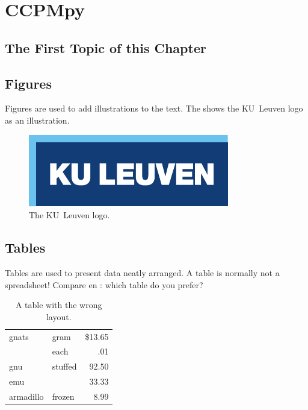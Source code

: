 \chapter{CCPMpy}
\label{cha:3}

\section{The First Topic of this Chapter}
\lipsum[78]


\section{Figures}
Figures are used to add illustrations to the text. The  shows
the KU~Leuven logo as an illustration.
\begin{figure}
	\centering
	\includegraphics{logokul}
	\caption{The KU~Leuven logo.}
	\label{fig:logo}
\end{figure}

\section{Tables}
Tables are used to present data neatly arranged. A table is normally
not a spreadsheet! Compare  en : which table do
you prefer?

\begin{table}
	\centering
	\begin{tabular}{||l|lr||} \hline
		gnats     & gram      & \$13.65 \\ \cline{2-3}
		& each      & .01 \\ \hline
		gnu       & stuffed   & 92.50 \\ \cline{1-1} \cline{3-3}
		emu       &           & 33.33 \\ \hline
		armadillo & frozen    & 8.99 \\ \hline
	\end{tabular}
	\caption{A table with the wrong layout.}
	\label{tab:wrong}
\end{table}

